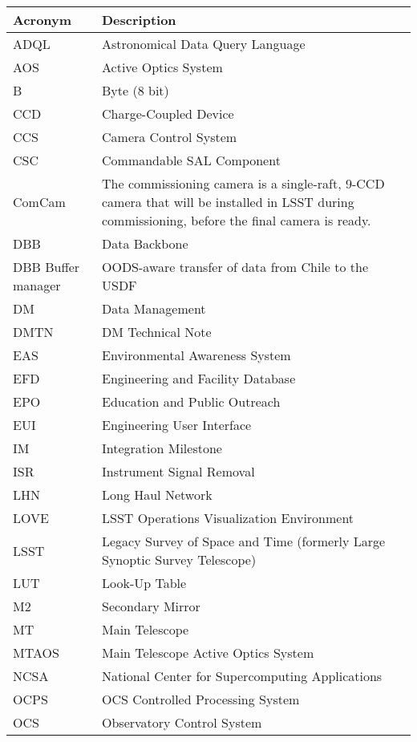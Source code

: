 \addtocounter{table}{-1}
\begin{longtable}{p{}p{}}\hline
\textbf{Acronym} & \textbf{Description}  \\\hline

ADQL & Astronomical Data Query Language \\\hline
AOS & Active Optics System \\\hline
B & Byte (8 bit) \\\hline
CCD & Charge-Coupled Device \\\hline
CCS & Camera Control System \\\hline
CSC & Commandable SAL Component \\\hline
ComCam & The commissioning camera is a single-raft, 9-CCD camera that will be installed in LSST during commissioning, before the final camera is ready. \\\hline
DBB & Data Backbone \\\hline
DBB Buffer manager & OODS-aware transfer of data from Chile to the USDF \\\hline
DM & Data Management \\\hline
DMTN & DM Technical Note \\\hline
EAS & Environmental Awareness System \\\hline
EFD & Engineering and Facility Database \\\hline
EPO & Education and Public Outreach \\\hline
EUI & Engineering User Interface \\\hline
IM & Integration Milestone \\\hline
ISR & Instrument Signal Removal \\\hline
LHN & Long Haul Network \\\hline
LOVE & LSST Operations Visualization Environment \\\hline
LSST & Legacy Survey of Space and Time (formerly Large Synoptic Survey Telescope) \\\hline
LUT & Look-Up Table \\\hline
M2 & Secondary Mirror \\\hline
MT & Main Telescope \\\hline
MTAOS & Main Telescope Active Optics System \\\hline
NCSA & National Center for Supercomputing Applications \\\hline
OCPS & OCS Controlled Processing System \\\hline
OCS & Observatory Control System \\\hline

\end{longtable}
